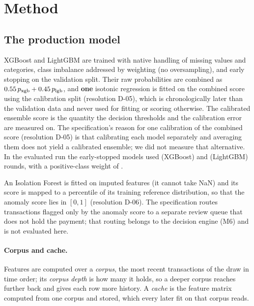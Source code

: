 \section{Method}
\label{sec:method}

\subsection{The production model}

XGBoost \cite{chen2016xgboost} and LightGBM \cite{ke2017lightgbm} are trained with native handling of missing values and categories, class
imbalance addressed by weighting (no oversampling), and early stopping on the validation split.
Their raw probabilities are combined as $0.55\,p_{\mathrm{xgb}} +
0.45\,p_{\mathrm{lgb}}$, and \textbf{one} isotonic regression \cite{zadrozny2002calibration} is fitted on the combined
score using the calibration split (resolution D-05), which is chronologically later than the
validation data and
never used for fitting or scoring otherwise. The calibrated ensemble score is the quantity the
decision thresholds and the calibration error are measured on. The specification's reason for one
calibration of the combined score (resolution D-05) is that calibrating each model separately and
averaging them does not yield a calibrated ensemble; we did not measure that alternative. In the evaluated run the
early-stopped models used \nGateXGBRounds{} (XGBoost) and \nGateLGBRounds{} (LightGBM) rounds,
with a positive-class weight of \nGateSPW{}.

An Isolation Forest \cite{liu2008iforest} is fitted on imputed features (it cannot take NaN) and its score is mapped to
a percentile of its training reference distribution, so that the anomaly score lies in $[0, 1]$
(resolution D-06). The specification routes transactions flagged only by the anomaly score to a
separate review queue that does not hold the payment; that routing belongs to the decision
engine (M6) and is not evaluated here.

\paragraph{Corpus and cache.} Features are computed over a \emph{corpus}, the most recent transactions
of the draw in time order; its \emph{corpus depth} is how many it holds, so a deeper corpus reaches
further back and gives each row more history. A \emph{cache} is the feature matrix computed from one
corpus and stored, which every later fit on that corpus reads.

